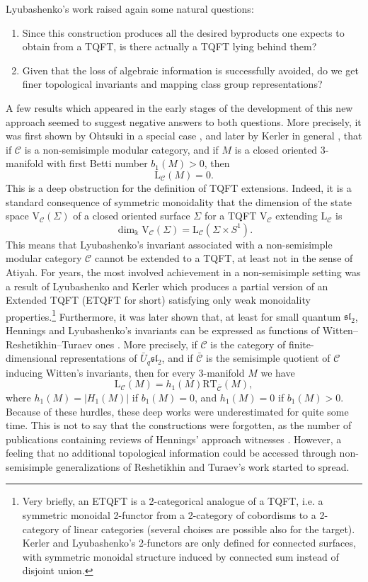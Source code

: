 \documentclass[a4paper,reqno]{amsart}
\theoremstyle{definition}
\theoremstyle{remark}
\newcommand{\rmL}{\mathrm{L}}
\newcommand{\rmV}{\mathrm{V}}
\newcommand{\calC}{\mathcal{C}}
\renewcommand{\Sigma}{\varSigma}
\newcommand{\fsl}{\mathfrak{sl}}
\newcommand{\RT}{\mathrm{RT}}
\begin{document}
Lyubashenko's work raised again some natural questions:
\begin{enumerate}
 \item Since this construction produces all the desired byproducts one expects to obtain from a TQFT, is there actually a TQFT lying behind them? 
 \item Given that the loss of algebraic information is successfully avoided, do we get finer topological invariants and mapping class group representations?
\end{enumerate}  
A few results which appeared in the early stages of the development of this new approach seemed to suggest negative answers to both questions. More precisely, it was first shown by Ohtsuki in a special case \cite{Oh95}, and later by Kerler in general \cite{K96b}, that if $\calC$ is a non-semisimple modular category, and if $M$ is a closed oriented 3-manifold with first Betti number $b_1(M) > 0$, then
\[
 \rmL_\calC(M) = 0.
\]
This is a deep obstruction for the definition of TQFT extensions. Indeed, it is a standard consequence of symmetric monoidality that the dimension of the state space $\rmV_\calC(\Sigma)$ of a closed oriented surface $\Sigma$ for a TQFT $\rmV_\calC$ extending $\rmL_\calC$ is
\[
 \dim_\Bbbk \rmV_\calC(\Sigma) = \rmL_\calC(\Sigma \times S^1).
\]
This means that Lyubashenko's invariant associated with a non-semisimple modular category $\calC$ cannot be extended to a TQFT, at least not in the sense of Atiyah. For years, the most involved achievement in a non-semisimple setting was a result of Lyubashenko and Kerler \cite{KL01} which produces a partial version of an Extended TQFT (ETQFT for short) satisfying only weak monoidality properties.\footnote{Very briefly, an ETQFT is a 2-categorical analogue of a TQFT, i.e. a symmetric monoidal 2-functor from a 2-category of cobordisms to a 2-category of linear categories (several choises are possible also for the target). Kerler and Lyubashenko's 2-functors are only defined for connected surfaces, with symmetric monoidal structure induced by connected sum instead of disjoint union.} Furthermore, it was later shown that, at least for small quantum $\fsl_2$, Hennings and Lyubashenko's invariants can be expressed as functions of Witten--Reshetikhin--Turaev ones \cite{CKS07}. More precisely, if $\calC$ is the category of finite-dimensional representations of $\bar{U}_q \fsl_2$, and if $\bar{\calC}$ is the semisimple quotient of $\calC$ inducing Witten's invariants, then for every 3-manifold $M$ we have
\[
 \rmL_\calC(M) = h_1(M) \RT_{\bar{\calC}}(M),
\]
where $h_1(M) = \left| H_1(M) \right|$ if $b_1(M) = 0$, and $h_1(M) = 0$ if $b_1(M) > 0$. Because of these hurdles, these deep works were underestimated for quite some time. This is not to say that the constructions were forgotten, as the number of publications containing reviews of Hennings' approach witnesses \cite{K96a,V03,H05}. However, a feeling that no additional topological information could be accessed through non-semisimple generalizations of Reshetikhin and Turaev's work started to spread.
\end{document}
